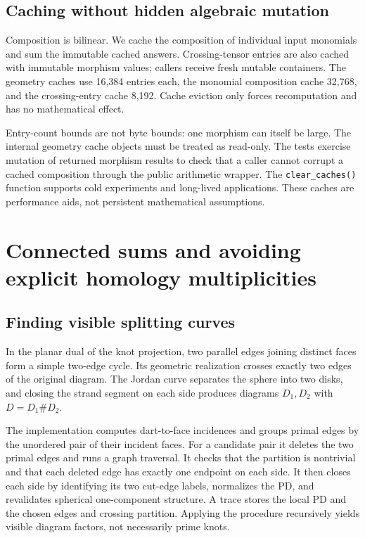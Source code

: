 \documentclass[11pt]{article}
\theoremstyle{definition}\newtheorem{definition}[theorem]{Definition}
\theoremstyle{remark}\newtheorem{remark}[theorem]{Remark}
\begin{document}
\subsection{Caching without hidden algebraic mutation}
Composition is bilinear. We cache the composition of individual input
monomials and sum the immutable cached answers. Crossing-tensor entries are
also cached with immutable morphism values; callers receive fresh mutable
containers. The geometry caches use 16,384 entries each, the monomial
composition cache 32,768, and the crossing-entry cache 8,192. Cache eviction
only forces recomputation and has no mathematical effect.

Entry-count bounds are not byte bounds: one morphism can itself be large.
The internal geometry cache objects must be treated as read-only. The tests
exercise mutation of returned morphism results to check that a caller cannot
corrupt a cached composition through the public arithmetic wrapper. The
\texttt{clear\_caches()} function supports cold experiments and long-lived
applications. These caches are performance aids, not persistent mathematical
assumptions.

\section{Connected sums and avoiding explicit homology multiplicities}
\label{sec:factor}
\subsection{Finding visible splitting curves}
In the planar dual of the knot projection, two parallel edges joining distinct
faces form a simple two-edge cycle. Its geometric realization crosses exactly
two edges of the original diagram. The Jordan curve separates the sphere into
two disks, and closing the strand segment on each side produces diagrams
$D_1,D_2$ with $D=D_1\#D_2$.

The implementation computes dart-to-face incidences and groups primal edges by
the unordered pair of their incident faces. For a candidate pair it deletes the
two primal edges and runs a graph traversal. It checks that the partition is
nontrivial and that each deleted edge has exactly one endpoint on each side.
It then closes each side by identifying its two cut-edge labels, normalizes
the PD, and revalidates spherical one-component structure. A trace stores the
local PD and the chosen edges and crossing partition. Applying the procedure
recursively yields visible diagram factors, not necessarily prime knots.
\end{document}
